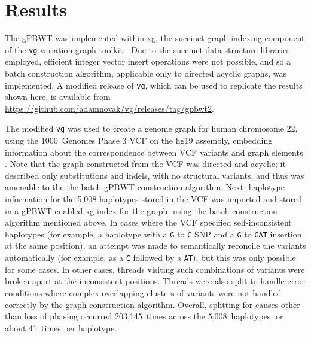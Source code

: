 
\section{Results}

The gPBWT was implemented within xg, the succinct graph indexing component of the \texttt{vg} variation graph toolkit \cite{garrison2016vg}. Due to the succinct data structure libraries employed, efficient integer vector insert operations were not possible, and so a batch construction algorithm, applicable only to directed acyclic graphs, was implemented.  A modified release of \texttt{vg}, which can be used to replicate the results shown here, is available from \url{https://github.com/adamnovak/vg/releases/tag/gpbwt2}.

The modified \texttt{vg} was used to create a genome graph for human chromosome 22, using the 1000~Genomes Phase 3 VCF on the hg19 assembly, embedding information about the correspondence between VCF variants and graph elements \cite{10002015global}. Note that the graph constructed from the VCF was directed and acyclic; it described only substitutions and indels, with no structural variants, and thus was amenable to the the batch gPBWT construction algorithm. Next, haplotype information for the 5,008 haplotypes stored in the VCF was imported and stored in a gPBWT-enabled xg index for the graph, using the batch construction algorithm mentioned above. In cases where the VCF specified self-inconsistent haplotypes (for example, a haplotype with a \texttt{G} to \texttt{C} SNP and a \texttt{G} to \texttt{GAT} insertion at the same position), an attempt was made to semantically reconcile the variants automatically (for example, as a \texttt{C} followed by a \texttt{AT}), but this was only possible for some cases. In other cases, threads visiting such combinations of variants were broken apart at the inconsistent positions. Threads were also split to handle error conditions where complex overlapping clusters of variants were not handled correctly by the graph construction algorithm. Overall, splitting for causes other than loss of phasing occurred 203,145~times across the 5,008~haplotypes, or about 41~times per haplotype.

